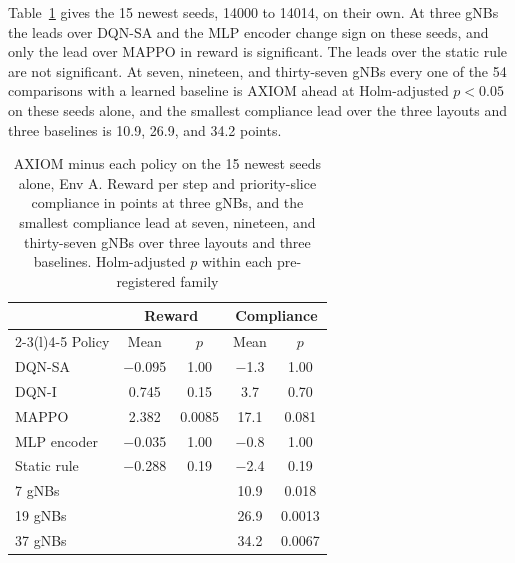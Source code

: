 \documentclass[9pt]{extarticle}
\begin{document}
Table~\ref{tab:s-new} gives the 15 newest seeds, 14000 to 14014, on their own. At three gNBs the leads over DQN-SA and the MLP encoder change sign on these seeds, and only the lead over MAPPO in reward is significant. The leads over the static rule are not significant. At seven, nineteen, and thirty-seven gNBs every one of the 54 comparisons with a learned baseline is AXIOM ahead at Holm-adjusted $p<0.05$ on these seeds alone, and the smallest compliance lead over the three layouts and three baselines is 10.9, 26.9, and 34.2 points.

\begin{table}[!htbp]
\caption{AXIOM minus each policy on the 15 newest seeds alone, Env A. Reward per step and priority-slice compliance in points at three gNBs, and the smallest compliance lead at seven, nineteen, and thirty-seven gNBs over three layouts and three baselines. Holm-adjusted $p$ within each pre-registered family}
\label{tab:s-new}
\centering
\scriptsize
\begin{tabular}{@{}lcccc@{}}
\toprule
& \multicolumn{2}{c}{Reward} & \multicolumn{2}{c}{Compliance} \\
\cmidrule(lr){2-3}\cmidrule(l){4-5}
Policy & Mean & $p$ & Mean & $p$ \\
\midrule
DQN-SA & $-$0.095 & 1.00 & $-$1.3 & 1.00 \\
DQN-I & 0.745 & 0.15 & 3.7 & 0.70 \\
MAPPO & 2.382 & 0.0085 & 17.1 & 0.081 \\
MLP encoder & $-$0.035 & 1.00 & $-$0.8 & 1.00 \\
Static rule & $-$0.288 & 0.19 & $-$2.4 & 0.19 \\
\midrule
7 gNBs & & & 10.9 & 0.018 \\
19 gNBs & & & 26.9 & 0.0013 \\
37 gNBs & & & 34.2 & 0.0067 \\
\bottomrule
\end{tabular}
\end{table}
\end{document}
